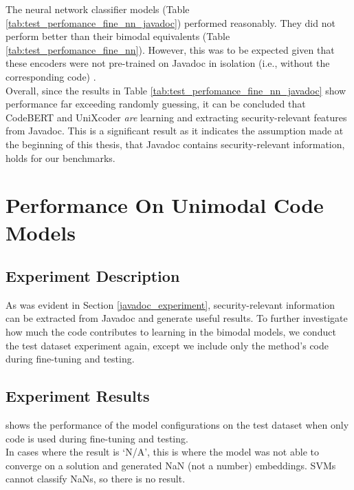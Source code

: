 \noindent
The neural network classifier models (Table \ref{tab:test_perfomance_fine_nn_javadoc}) performed reasonably. They did not perform better than their bimodal equivalents (Table \ref{tab:test_perfomance_fine_nn}). However, this was to be expected given that these encoders were not pre-trained on Javadoc in isolation (i.e., without the corresponding code) \cite{CodeBERT}\cite{unixcoder}.\\

\noindent
Overall, since the results in Table \ref{tab:test_perfomance_fine_nn_javadoc} show performance far exceeding randomly guessing, it can be concluded that CodeBERT and UniXcoder \emph{are} learning and extracting security-relevant features from Javadoc. This is a significant result as it indicates the assumption made at the beginning of this thesis, that Javadoc contains security-relevant information, holds for our benchmarks.  

\section{Performance On Unimodal Code Models}

\subsection{Experiment Description}

\noindent
As was evident in Section \ref{javadoc_experiment}, security-relevant information can be extracted from Javadoc and generate useful results. To further investigate how much the code contributes to learning in the bimodal models, we conduct the test dataset experiment again, except we include only the method's code during fine-tuning and testing.

\subsection{Experiment Results}

 shows the performance of the model configurations on the test dataset when only code is used during fine-tuning and testing. \\

\noindent
In cases where the result is `N/A', this is where the model was not able to converge on a solution and generated NaN (not a number) embeddings. SVMs cannot classify NaNs, so there is no result. 

